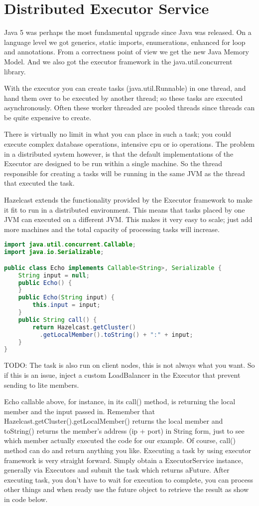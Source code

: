 \chapter{Distributed Executor Service}

Java 5 was perhaps the most fundamental upgrade since Java was released. On a language level we got generics, static imports, enumerations, enhanced for loop and annotations. From a correctness point of view we get the new Java Memory Model. And we also got the executor framework in the java.util.concurrent library.

With the executor you can create tasks (java.util.Runnable) in one thread, and hand them over to be executed by another thread; so these tasks are executed asynchronously. Often these worker threaded are pooled threads since threads can be quite expensive to create. 

There is virtually no limit in what you can place in such a task; you could execute complex database operations, intensive cpu or io operations. The problem in a distributed system however, is that the default implementations of the Executor are designed to be run within a single machine. So the thread responsible for creating a tasks will be running in the same JVM as the thread that executed the task.

Hazelcast extends the functionality provided by the Executor framework to make it fit to run in a distributed environment. This means that tasks placed by one JVM can executed on a different JVM. This makes it very easy to scale; just add more machines and the total capacity of processing tasks will increase.


\begin{lstlisting}[language=java]
import java.util.concurrent.Callable;
import java.io.Serializable;

public class Echo implements Callable<String>, Serializable {
    String input = null;
    public Echo() {
    }
    public Echo(String input) {
        this.input = input;
    }
    public String call() {
        return Hazelcast.getCluster()
          .getLocalMember().toString() + ":" + input;
    }
}
\end{lstlisting}


TODO: The task is also run on client nodes, this is not always what you want. So if this is an issue, inject a custom LoadBalancer in the Executor that prevent sending to lite members.

Echo callable above, for instance, in its call() method, is returning the local member and the input passed in. Remember that Hazelcast.getCluster().getLocalMember() returns the local member and toString() returns the member's address (ip + port) in String form, just to see which member actually executed the code for our example. Of course, call() method can do and return anything you like. Executing a task by using executor framework is very straight forward. Simply obtain a ExecutorService instance, generally via Executors and submit the task which returns aFuture. After executing task, you don't have to wait for execution to complete, you can process other things and when ready use the future object to retrieve the result as show in code below.


